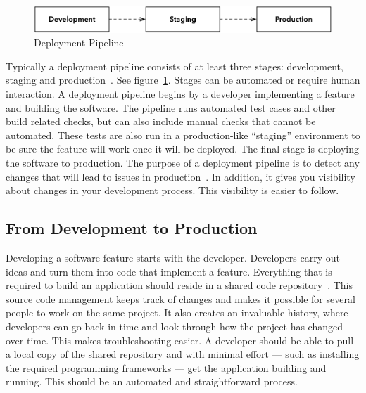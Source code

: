 \documentclass[english]{tktltiki2}
\begin{document}
\begin{figure}[h!]

    \centering
    \vspace{1cm}

    \includegraphics[scale = 0.6]{figures/deployment-pipeline}

    \caption{Deployment Pipeline}
    \label{figure:deployment-pipeline}

    \vspace{1cm}

\end{figure}

Typically a deployment pipeline consists of at least three stages: development, staging and production~\cite{HF11}. See figure~\ref{figure:deployment-pipeline}. Stages can be automated or require human interaction. A deployment pipeline begins by a developer implementing a feature and building the software. The pipeline runs automated test cases and other build related checks, but can also include manual checks that cannot be automated. These tests are also run in a production-like “staging” environment to be sure the feature will work once it will be deployed. The final stage is deploying the software to production. The purpose of a deployment pipeline is to detect any changes that will lead to issues in production~\cite{Fow13b}. In addition, it gives you visibility about changes in your development process. This visibility is easier to follow.

\subsection{From Development to Production}

Developing a software feature starts with the developer. Developers carry out ideas and turn them into code that implement a feature. Everything that is required to build an application should reside in a shared code repository~\cite{HF11}. This source code management keeps track of changes and makes it possible for several people to work on the same project. It also creates an invaluable history, where developers can go back in time and look through how the project has changed over time. This makes troubleshooting easier. A developer should be able to pull a local copy of the shared repository and with minimal effort — such as installing the required programming frameworks — get the application building and running. This should be an automated and straightforward process.
\end{document}
